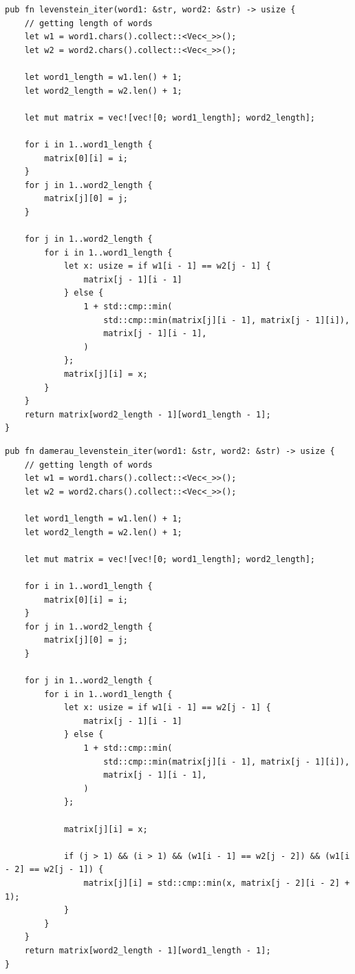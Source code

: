 \documentclass[12pt]{report}
\begin{document}
\newpage

\begin{lstlisting}[label=some-code,caption=Функция нахождения расстояния Левенштейна матрично]
pub fn levenstein_iter(word1: &str, word2: &str) -> usize {
	// getting length of words
	let w1 = word1.chars().collect::<Vec<_>>();
	let w2 = word2.chars().collect::<Vec<_>>();

	let word1_length = w1.len() + 1;
	let word2_length = w2.len() + 1;

	let mut matrix = vec![vec![0; word1_length]; word2_length];

	for i in 1..word1_length {
		matrix[0][i] = i;
	}
	for j in 1..word2_length {
		matrix[j][0] = j;
	}

	for j in 1..word2_length {
		for i in 1..word1_length {
			let x: usize = if w1[i - 1] == w2[j - 1] {
				matrix[j - 1][i - 1]
			} else {
				1 + std::cmp::min(
					std::cmp::min(matrix[j][i - 1], matrix[j - 1][i]),
					matrix[j - 1][i - 1],
				)
			};
			matrix[j][i] = x;
		}
	}
	return matrix[word2_length - 1][word1_length - 1];
}
\end{lstlisting}

\newpage

\begin{lstlisting}[label=some-code,caption=Функция нахождения расстояния Дамерау-Левенштейна матрично]
pub fn damerau_levenstein_iter(word1: &str, word2: &str) -> usize {
    // getting length of words
    let w1 = word1.chars().collect::<Vec<_>>();
    let w2 = word2.chars().collect::<Vec<_>>();

    let word1_length = w1.len() + 1;
    let word2_length = w2.len() + 1;

    let mut matrix = vec![vec![0; word1_length]; word2_length];

    for i in 1..word1_length {
        matrix[0][i] = i;
    }
    for j in 1..word2_length {
        matrix[j][0] = j;
    }

    for j in 1..word2_length {
        for i in 1..word1_length {
            let x: usize = if w1[i - 1] == w2[j - 1] {
                matrix[j - 1][i - 1]
            } else {
                1 + std::cmp::min(
                    std::cmp::min(matrix[j][i - 1], matrix[j - 1][i]),
                    matrix[j - 1][i - 1],
                )
            };

            matrix[j][i] = x;

            if (j > 1) && (i > 1) && (w1[i - 1] == w2[j - 2]) && (w1[i - 2] == w2[j - 1]) {
                matrix[j][i] = std::cmp::min(x, matrix[j - 2][i - 2] + 1);
            }
        }
    }
    return matrix[word2_length - 1][word1_length - 1];
}
\end{lstlisting}
\end{document}
